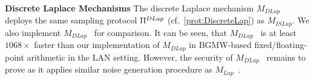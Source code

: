 \textbf{Discrete Laplace Mechanisms}
The discrete Laplace mechanism $M_{DLap}$ deploys the same sampling protocol $\Uppi^{DLap}$ (cf.~\autoref{prot:DiscreteLap}) as $M_{ISLap}$.
We also implement $M_{DLap}$~\cite{eigner2014differentially} for comparison.
It can be seen, that $M_{DLap}$~\cite{eigner2014differentially} is at least $1068\times$ faster than our implementation of $M_{DLap}$ in BGMW-based fixed/floating-point arithmetic in the LAN setting. However, the security of $M_{DLap}$~\cite{eigner2014differentially} remains to prove as it applies similar noise generation procedure as $M_{Lap}$~\cite{eigner2014differentially}.



